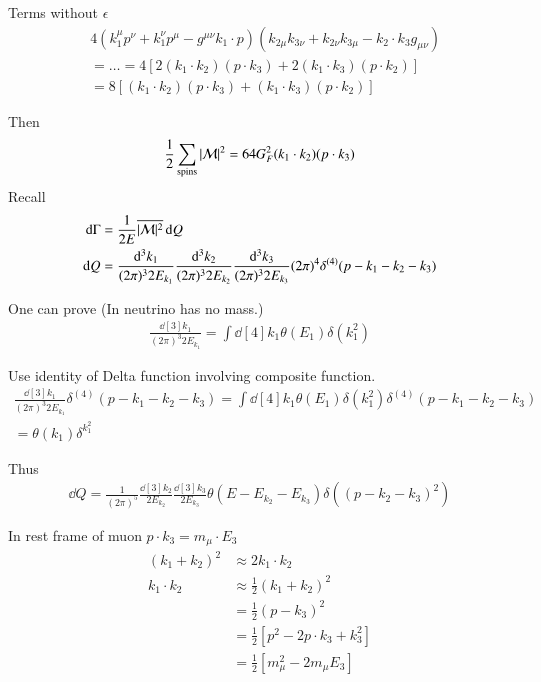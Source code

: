 Terms without $\epsilon$
\begin{align*}
   &4 (k_1^\mu p^\nu + k_1^\nu p^\mu - g^{\mu\nu} k_1 \cdot p) (k_{2 \mu} k_{3 \nu} + k_{2\nu} k_{3\mu} - k_2 \cdot k_3 g_{\mu\nu}) \\
   &= \dots = 4 \left[ 2 (k_1 \cdot k_2) (p\cdot k_3) + 2 (k_1\cdot k_3)( p \cdot k_2) \right] \\
   &= 8 \left[ (k_1 \cdot k_2)( p \cdot k_3) + (k_1 \cdot k_3) (p \cdot k_2) \right]
\end{align*}

Then
\begin{align*}
   \frac{1}{2} \sum_{\text{spins}} |\mathcal{M}|^2 = 64 G_F^2 (k_1 \cdot k_2)( p\cdot k_3)
\end{align*}
Recall
\begin{align}
   \begin{split}
   \dd{\Gamma} &= \frac{1}{2E} \overline{|\mathcal{M}|^2} \dd{Q} \\
   \dd{Q} &= \frac{\dd[3]{k_1}}{(2\pi)^3 2 E_{k_1}} \frac{\dd[3]{k_2}}{(2\pi)^3 2 E_{k_2}} \frac{\dd[3]{k_3}}{(2\pi)^3 2 E_{k_3}} (2\pi)^{4} \delta^{(4)} (p-k_1 -k_2 - k_3)
   \end{split}
\end{align}

One can prove (In \sm neutrino has no mass.)
\begin{align}
   \frac{\dd[3]{k_1}}{(2\pi)^3 2 E_{k_1}} = \int \dd[4]{k_1} \theta(E_1) \delta(k_1^2)
\end{align}

Use identity of Delta function involving composite function.
\begin{align*}
   \frac{\dd[3]{k_1}}{(2\pi)^3 2 E_{k_1}} \delta^{(4)}(p- k_1 -k_2 - k_3 ) = \int \dd[4]{k_1} \theta(E_1) \delta(k_1^2) \delta^{(4)}(p- k_1 -k_2 - k_3 ) \\
   = \theta(k_1)\delta^{k_1^2}
\end{align*}

Thus 
\begin{align*}
   \dd{Q} = \frac{1}{(2\pi)^5} \frac{\dd[3]{k_2}}{2E_{k_2}} \frac{\dd[3]{k_3}}{2E_{k_3}} \theta(E - E_{k_2} - E_{k_3}) \delta((p-k_2-k_3)^2)
\end{align*}

In rest frame of muon 
$p \cdot k_3 = m_\mu \cdot E_3$
\begin{align*}
   (k_1 + k_2)^2 &\approx 2 k_1 \cdot k_2 \\
   k_1 \cdot k_2 &\approx \frac{1}{2} (k_1 + k_2)^2 \\
                 &= \frac{1}{2} (p-k_3)^2 \\
                  &= \frac{1}{2} \left[ p^2 - 2 p\cdot k_3 + k_3^2 \right] \\
                  &= \frac{1}{2} [m_\mu^2 - 2 m_\mu E_3]
\end{align*}

